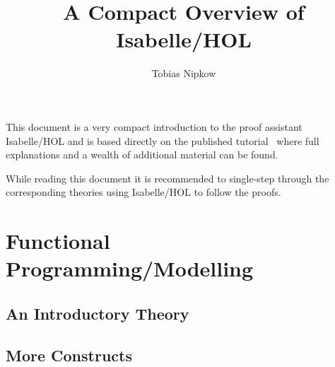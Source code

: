 \documentclass[11pt,a4paper]{article}
\begin{document}
\title{A Compact Overview of Isabelle/HOL}
\author{Tobias Nipkow}
\date{}
\maketitle

\noindent
This document is a very compact introduction to the proof assistant
Isabelle/HOL and is based directly on the published tutorial~\cite{LNCS2283}
where full explanations and a wealth of additional material can be found.

While reading this document it is recommended to single-step through the
corresponding theories using Isabelle/HOL to follow the proofs.

\section{Functional Programming/Modelling}

\subsection{An Introductory Theory}


\subsection{More Constructs}
















\end{document}
